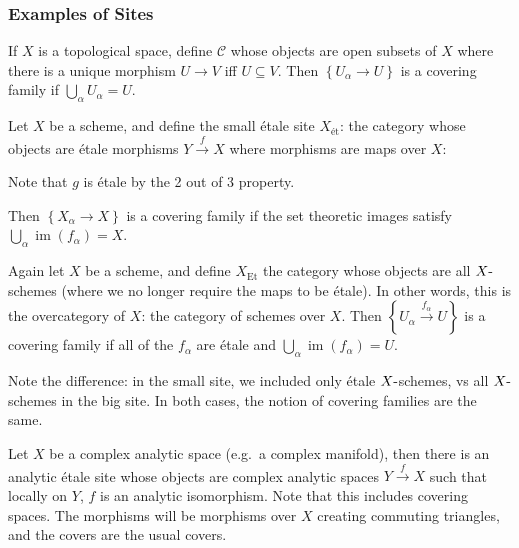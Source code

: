 \hypertarget{examples-of-sites}{%
\subsubsection{Examples of Sites}\label{examples-of-sites}}

\begin{example}

If \(X\) is a topological space, define \(\mathcal{C}\) whose objects
are open subsets of \(X\) where there is a unique morphism \(U\to V\)
iff \(U\subseteq V\). Then \(\left\{{U_\alpha \to U}\right\}\) is a
covering family if \(\bigcup_\alpha U_\alpha = U\).

\end{example}

\begin{example}

Let \(X\) be a scheme, and define the small étale site
\(X_{\text{ét}}\): the category whose objects are étale morphisms
\(Y\xrightarrow{f} X\) where morphisms are maps over \(X\):

Note that \(g\) is étale by the 2 out of 3 property.

Then \(\left\{{X_\alpha\to X}\right\}\) is a covering family if the set
theoretic images satisfy
\(\bigcup_\alpha \operatorname{im}(f_\alpha) = X\).

\end{example}

\begin{example}

Again let \(X\) be a scheme, and define \(X_{\mathrm{Et}}\) the category
whose objects are all \(X{\hbox{-}}\)schemes (where we no longer require
the maps to be étale). In other words, this is the overcategory of
\(X\): the category of schemes over \(X\). Then
\(\left\{{U_\alpha\xrightarrow{f_\alpha}U}\right\}\) is a covering
family if all of the \(f_\alpha\) are étale and
\(\bigcup_\alpha \operatorname{im}(f_\alpha) = U\).

\end{example}

Note the difference: in the small site, we included only étale
\(X{\hbox{-}}\)schemes, vs all \(X{\hbox{-}}\)schemes in the big site.
In both cases, the notion of covering families are the same.

\begin{example}[?]

Let \(X\) be a complex analytic space (e.g.~a complex manifold), then
there is an analytic étale site whose objects are complex analytic
spaces \(Y\xrightarrow{f} X\) such that locally on \(Y\), \(f\) is an
analytic isomorphism. Note that this includes covering spaces. The
morphisms will be morphisms over \(X\) creating commuting triangles, and
the covers are the usual covers.

\end{example}

